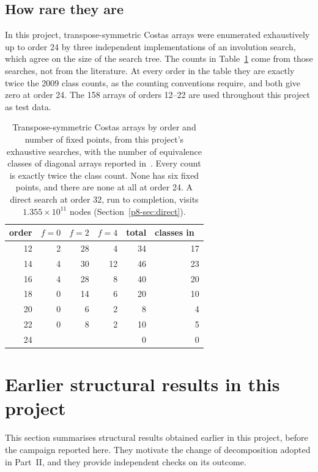 \documentclass[11pt,a4paper,oneside]{report}
\theoremstyle{definition}
\begin{document}
\subsection{How rare they are}

In this project, transpose-symmetric Costas arrays were enumerated exhaustively up to order 24
by three independent implementations of an involution search, which agree on the size of the
search tree. The counts in Table~\ref{p8-tab:symcounts} come from those searches, not from the
literature. At every order in the table they are exactly twice the 2009 class counts, as the
counting conventions require, and both give zero at order 24. The 158 arrays of orders 12--22
are used throughout this project as test data.

\begin{table}[H]
\centering
\begin{tabular}{@{}rrrrrr@{}}
\toprule
order & $f=0$ & $f=2$ & $f=4$ & total & classes in~\cite{p8-taylor2009} \\
\midrule
12 & 2 & 28 & 4 & 34 & 17 \\
14 & 4 & 30 & 12 & 46 & 23 \\
16 & 4 & 28 & 8 & 40 & 20 \\
18 & 0 & 14 & 6 & 20 & 10 \\
20 & 0 & 6 & 2 & 8 & 4 \\
22 & 0 & 8 & 2 & 10 & 5 \\
24 & & & & 0 & 0 \\
\bottomrule
\end{tabular}
\caption{Transpose-symmetric Costas arrays by order and number of fixed points, from this
project's exhaustive searches, with the number of equivalence classes of diagonal arrays reported
in~\cite{p8-taylor2009}. Every count is exactly twice the class count. None has
six fixed points, and there are none at all at order 24. A direct search at order 32, run to completion,
visits $1.355\times10^{11}$ nodes (Section~\ref{p8-sec:direct}).}
\label{p8-tab:symcounts}
\end{table}

\section{Earlier structural results in this project}\label{p8-sec:earlier}
This section summarises structural results obtained earlier in this project, before the campaign reported here. They motivate the change of decomposition adopted in Part~II, and they provide independent checks on its outcome.
\end{document}
